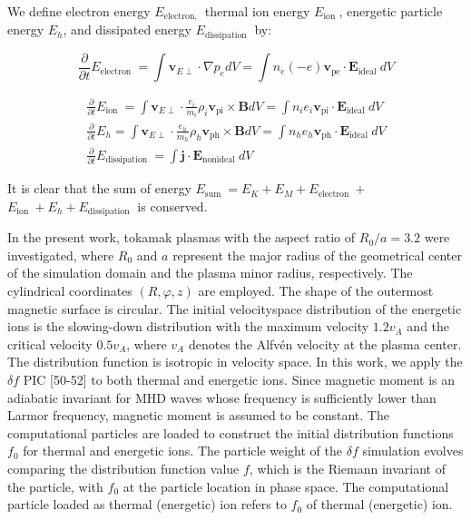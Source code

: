 \documentclass[10pt]{article}
\begin{document}
We define electron energy $E_{\text {electron, }}$ thermal ion energy $E_{\text {ion }}$, energetic particle energy $E_{h}$, and dissipated energy $E_{\text {dissipation }}$ by:

$$
\frac{\partial}{\partial t} E_{\text {electron }}=\int \mathbf{v}_{E \perp} \cdot \nabla p_{e} d V=\int n_{e}(-e) \mathbf{v}_{\mathrm{pe}} \cdot \mathbf{E}_{\text {ideal }} d V
$$

$$
\begin{gathered}
\frac{\partial}{\partial t} E_{\text {ion }}=\int \mathbf{v}_{E \perp} \cdot \frac{e_{i}}{m_{i}} \rho_{i} \mathbf{v}_{\mathrm{pi}} \times \mathbf{B} d V=\int n_{i} e_{i} \mathbf{v}_{\mathrm{pi}} \cdot \mathbf{E}_{\text {ideal }} d V \\
\frac{\partial}{\partial t} E_{h}=\int \mathbf{v}_{E \perp} \cdot \frac{e_{h}}{m_{h}} \rho_{h} \mathbf{v}_{\mathrm{ph}} \times \mathbf{B} d V=\int n_{h} e_{h} \mathbf{v}_{\mathrm{ph}} \cdot \mathbf{E}_{\text {ideal }} d V \\
\frac{\partial}{\partial t} E_{\text {dissipation }}=\int \mathbf{j} \cdot \mathbf{E}_{\text {nonideal }} d V
\end{gathered}
$$

It is clear that the sum of energy $E_{\text {sum }}=E_{K}+E_{M}+E_{\text {electron }}+$ $E_{\text {ion }}+E_{h}+E_{\text {dissipation }}$ is conserved.

In the present work, tokamak plasmas with the aspect ratio of $R_{0} / a=3.2$ were investigated, where $R_{0}$ and $a$ represent the major radius of the geometrical center of the simulation domain and the plasma minor radius, respectively. The cylindrical coordinates $(R, \varphi, z)$ are employed. The shape of the outermost magnetic surface is circular. The initial velocityspace distribution of the energetic ions is the slowing-down distribution with the maximum velocity $1.2 v_{A}$ and the critical velocity $0.5 v_{A}$, where $v_{A}$ denotes the Alfvén velocity at the plasma center. The distribution function is isotropic in velocity space. In this work, we apply the $\delta f$ PIC [50-52] to both thermal and energetic ions. Since magnetic moment is an adiabatic invariant for MHD waves whose frequency is sufficiently lower than Larmor frequency, magnetic moment is assumed to be constant. The computational particles are loaded to construct the initial distribution functions $f_{0}$ for thermal and energetic ions. The particle weight of the $\delta f$ simulation evolves comparing the distribution function value $f$, which is the Riemann invariant of the particle, with $f_{0}$ at the particle location in phase space. The computational particle loaded as thermal (energetic) ion refers to $f_{0}$ of thermal (energetic) ion.
\end{document}
